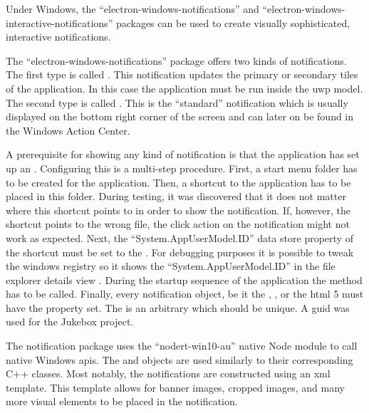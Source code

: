 


Under Windows, the \enquote{electron-windows-notifications} \cite{winNot} and \enquote{electron-windows-interactive-notifications} \cite{winIntNot} packages can be used to create visually sophisticated, interactive notifications.

The \enquote{electron-windows-notifications} package offers two kinds of notifications. The first type is called . This notification updates the primary or secondary tiles of the application. In this case the application must be run inside the \gls{uwp} model. The second type is called . This is the \enquote{standard} notification which is usually displayed on the bottom right corner of the screen and can later on be found in the Windows Action Center.

A prerequisite for showing any kind of notification is that the application has set up an . Configuring this  is a multi-step procedure. First, a start menu folder has to be created for the application. Then, a shortcut to the application has to be placed in this folder. During testing, it was discovered that it does not matter where this shortcut points to in order to show the notification. If, however, the shortcut points to the wrong file, the click action on the notification might not work as expected. Next, the \enquote{System.AppUserModel.ID} data store property of the shortcut must be set to the  \cite{eNotWinAppId}. For debugging purposes it is possible to tweak the windows registry so it shows the \enquote{System.AppUserModel.ID} in the file explorer details view \cite{showAppId}. During the startup sequence of the application the  method has to be called. Finally, every notification object, be it the , , or the \gls{html} 5  must have the  property set. The  is an arbitrary  which should be unique. A \gls{guid} was used for the Jukebox project.

The notification package uses the \enquote{nodert-win10-au} native Node module to call native Windows \gls{api}s. The  and  objects are used similarly to their corresponding C++ classes. Most notably, the notifications are constructed using an \gls{xml} template. This template allows for banner images, cropped images, and many more visual elements to be placed in the notification.

